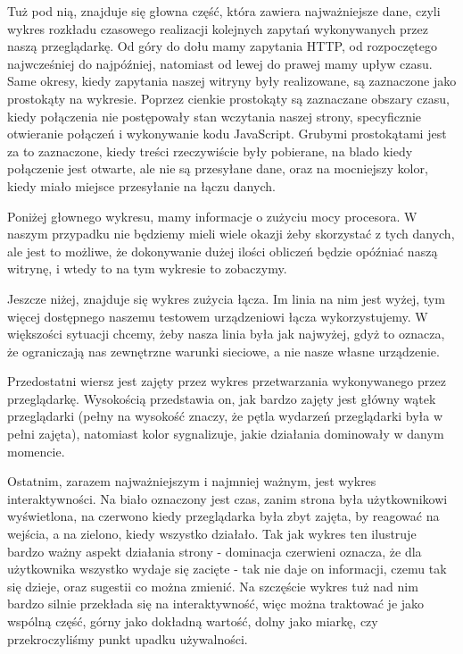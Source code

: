 \documentclass[licencjacka]{pracadypl}
\begin{document}
Tuż pod nią, znajduje się głowna część, która zawiera najważniejsze dane, czyli wykres rozkładu czasowego realizacji kolejnych zapytań wykonywanych przez naszą przeglądarkę. Od góry do dołu mamy zapytania HTTP, od rozpoczętego najwcześniej do najpóźniej, natomiast od lewej do prawej mamy upływ czasu. Same okresy, kiedy zapytania naszej witryny były realizowane, są zaznaczone jako prostokąty na wykresie. Poprzez cienkie prostokąty są zaznaczane obszary czasu, kiedy połączenia nie postępowały stan wczytania naszej strony, specyficznie otwieranie połączeń i wykonywanie kodu JavaScript. Grubymi prostokątami jest za to zaznaczone, kiedy treści rzeczywiście były pobierane, na blado kiedy połączenie jest otwarte, ale nie są przesyłane dane, oraz na mocniejszy kolor, kiedy miało miejsce przesyłanie na łączu danych.

Poniżej głownego wykresu, mamy informacje o zużyciu mocy procesora. W naszym przypadku nie będziemy mieli wiele okazji żeby skorzystać z tych danych, ale jest to możliwe, że dokonywanie dużej ilości obliczeń będzie opóźniać naszą witrynę, i wtedy to na tym wykresie to zobaczymy.

Jeszcze niżej, znajduje się wykres zużycia łącza. Im linia na nim jest wyżej, tym więcej dostępnego naszemu testowem urządzeniowi łącza wykorzystujemy. W większości sytuacji chcemy, żeby nasza linia była jak najwyżej, gdyż to oznacza, że ograniczają nas zewnętrzne warunki sieciowe, a nie nasze własne urządzenie.

Przedostatni wiersz jest zajęty przez wykres przetwarzania wykonywanego przez przeglądarkę. Wysokością przedstawia on, jak bardzo zajęty jest główny wątek przeglądarki (pełny na wysokość znaczy, że pętla wydarzeń przeglądarki była w pełni zajęta), natomiast kolor sygnalizuje, jakie działania dominowały w danym momencie.

Ostatnim, zarazem najważniejszym i najmniej ważnym, jest wykres interaktywności. Na biało oznaczony jest czas, zanim strona była użytkownikowi wyświetlona, na czerwono kiedy przeglądarka była zbyt zajęta, by reagować na wejścia, a na zielono, kiedy wszystko działało. Tak jak wykres ten ilustruje bardzo ważny aspekt działania strony - dominacja czerwieni oznacza, że dla użytkownika wszystko wydaje się zacięte - tak nie daje on informacji, czemu tak się dzieje, oraz sugestii co można zmienić. Na szczęście wykres tuż nad nim bardzo silnie przekłada się na interaktywność, więc można traktować je jako wspólną część, górny jako dokładną wartość, dolny jako miarkę, czy przekroczyliśmy punkt upadku używalności. 
\end{document}
